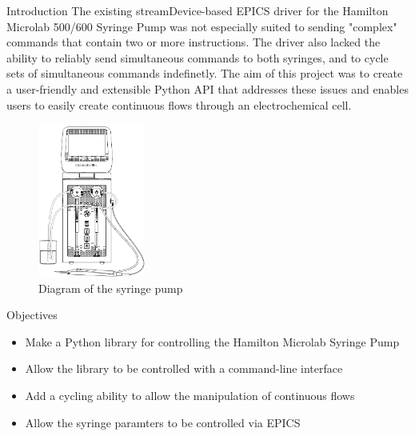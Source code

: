\documentclass[a0paper,landscape,fontscale=0.32]{baposter}
\begin{document}
\begin{poster}
\begin{posterbox}[name=introduction,column=0]{Introduction}
The existing streamDevice-based EPICS driver for the Hamilton Microlab 500/600 Syringe Pump was not
especially suited to sending "complex" commands that contain two or more instructions.
The driver also lacked the ability to reliably send simultaneous commands to both syringes, and to
cycle sets of simultaneous commands indefinetly. The aim of this project was to create a user-friendly
and extensible Python API that addresses these issues and enables users to easily create continuous flows
through an electrochemical cell.
\begin{figure}[H]
\begin{center}
\includegraphics[width=100pt]{images/syringediagram}
\caption{Diagram of the syringe pump}
\end{center}
\end{figure}
\end{posterbox}
\begin{posterbox}[name=objectives,column=0,row=0,below=introduction]{Objectives}
 \begin{itemize}
    \item Make a Python library for controlling the Hamilton Microlab Syringe Pump
    \item Allow the library to be controlled with a command-line interface
    \item Add a cycling ability to allow the manipulation of continuous flows
    \item Allow the syringe paramters to be controlled via EPICS

\end{itemize}
\end{posterbox}
\end{poster}
\end{document}
